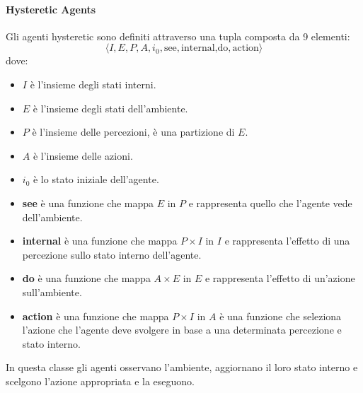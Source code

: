 \paragraph{Hysteretic Agents}
Gli agenti hysteretic sono definiti attraverso una tupla composta da 9 elementi:
\begin{equation*}
    \langle I, E, P, A, i_0, \text{see}, \text{internal,} \text{do}, \text{action} \rangle
\end{equation*}
dove:
\begin{itemize}
    \item $I$ è l'insieme degli stati interni.
    \item $E$ è l'insieme degli stati dell'ambiente.
    \item $P$ è l'insieme delle percezioni, è una partizione di $E$.
    \item $A$ è l'insieme delle azioni.
    \item $i_0$ è lo stato iniziale dell'agente.
    \item \textbf{see} è una funzione che mappa $E$ in $P$ e rappresenta quello
          che l'agente vede dell'ambiente.
    \item \textbf{internal} è una funzione che mappa $P \times I$ in $I$ e
          rappresenta l'effetto di una percezione sullo stato interno dell'agente.
    \item \textbf{do} è una funzione che mappa $A \times E$ in $E$ e rappresenta
          l'effetto di un'azione sull'ambiente.
    \item \textbf{action} è una funzione che mappa $P \times I$ in $A$ è una funzione
          che seleziona l'azione che l'agente deve svolgere in base a una determinata
          percezione e stato interno.
\end{itemize}
In questa classe gli agenti osservano l'ambiente, aggiornano il loro stato interno
e scelgono l'azione appropriata e la eseguono.
